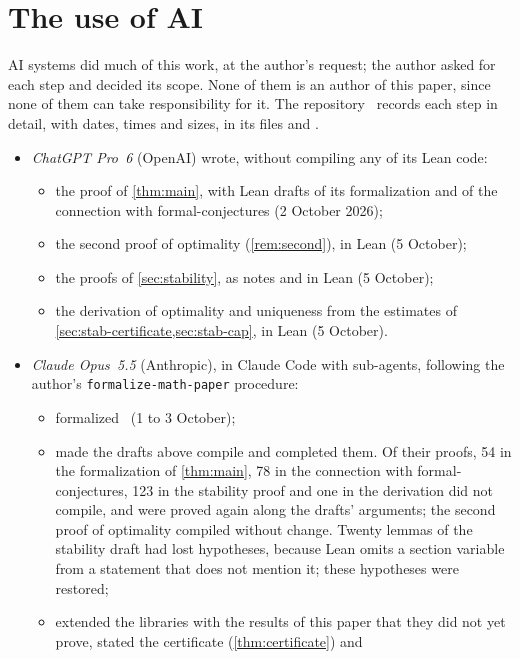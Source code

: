 \section{The use of AI}\label{app:ai}

AI systems did much of this work, at the author's request; the author asked for
each step and decided its scope. None of them is an author of this paper, since
none of them can take responsibility for it. The repository~\cite{Companion}
records each step in detail, with dates, times and sizes, in its files
 and .

\begin{itemize}
\item \emph{ChatGPT Pro~6} (OpenAI) wrote, without compiling any of its Lean
code:
  \begin{itemize}
  \item the proof of \cref{thm:main}, with Lean drafts of its formalization and
  of the connection with formal-conjectures (2 October 2026);
  \item the second proof of optimality (\cref{rem:second}), in Lean
  (5 October);
  \item the proofs of \cref{sec:stability}, as notes and in Lean (5 October);
  \item the derivation of optimality and uniqueness from the estimates of
  \cref{sec:stab-certificate,sec:stab-cap}, in Lean (5 October).
  \end{itemize}
\item \emph{Claude Opus~5.5} (Anthropic), in Claude Code with sub-agents,
following the author's \texttt{formalize-math-paper} procedure:
  \begin{itemize}
  \item formalized~\cite{Baek} (1 to 3 October);
  \item made the drafts above compile and completed them. Of their proofs, 54 in
  the formalization of \cref{thm:main}, 78 in the connection with
  formal-conjectures, 123 in the stability proof and one in the derivation did
  not compile, and were proved again along the drafts' arguments; the second
  proof of optimality compiled without change. Twenty lemmas of the stability
  draft had lost hypotheses, because Lean omits a section variable from a
  statement that does not mention it; these hypotheses were restored;
  \item extended the libraries with the results of this paper that they did not
  yet prove, stated the certificate (\cref{thm:certificate}) and

\end{itemize}
\end{itemize}
